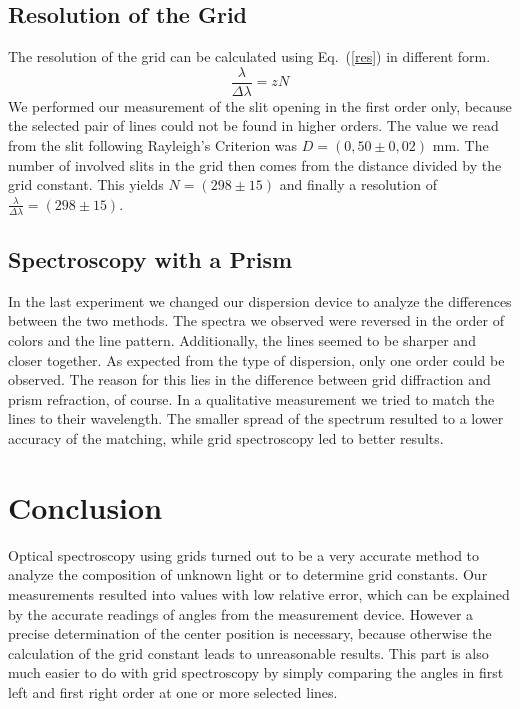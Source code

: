 \documentclass[a4paper,10pt]{article}
\begin{document}
\subsection{Resolution of the Grid}
The resolution of the grid can be calculated using Eq.~(\ref{res}) in different form.
\begin{equation}
\frac{\lambda}{\Delta\lambda} = z N
\end{equation}
We performed our measurement of the slit opening in the first order only, because the selected pair of lines could not be found in higher orders. The value we read from the slit following Rayleigh's Criterion was $D=(0,50 \pm 0,02)\text{ mm}$. The number of involved slits in the grid then comes from the distance divided by the grid constant. This yields $N = (298 \pm 15)$ and finally a resolution of $\frac{\lambda}{\Delta\lambda} = (298 \pm 15)$.

\subsection{Spectroscopy with a Prism}
In the last experiment we changed our dispersion device to analyze the differences between the two methods. The spectra we observed were reversed in the order of colors and the line pattern. Additionally, the lines seemed to be sharper and closer together. As expected from the type of dispersion, only one order could be observed. The reason for this lies in the difference between grid diffraction and prism refraction, of course. In a qualitative measurement we tried to match the lines to their wavelength. The smaller spread of the spectrum resulted to a lower accuracy of the matching, while grid spectroscopy led to better results.

\section{Conclusion}
Optical spectroscopy using grids turned out to be a very accurate method to analyze the composition of unknown light or to determine grid constants. Our measurements resulted into values with low relative error, which can be explained by the accurate readings of angles from the measurement device. However a precise determination of the center position is necessary, because otherwise the calculation of the grid constant leads to unreasonable results. This part is also much easier to do with grid spectroscopy by simply comparing the angles in first left and first right order at one or more selected lines.
\end{document}
